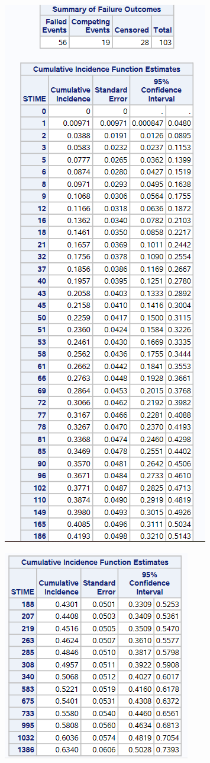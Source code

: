 \documentclass[
  12pt,
  letterpaper,
  DIV=11,
  numbers=noendperiod,
  onepage,
  openany]{scrreprt}
\begin{document}
\includegraphics{sas/9a.PNG}

\includegraphics{sas/9b.PNG}
\end{document}
